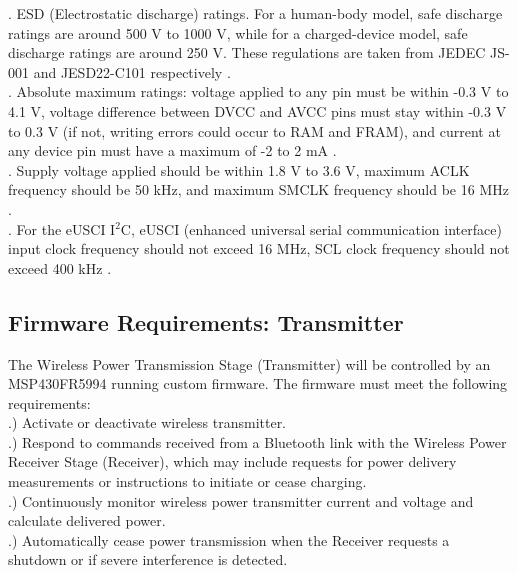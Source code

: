 \documentclass[12pt]{article}
\begin{document}
. ESD (Electrostatic discharge) ratings. For a human-body model, safe discharge ratings are around 500 V to 1000 V, while for a charged-device model, safe discharge ratings are around 250 V. These regulations are taken from JEDEC JS-001 and JESD22-C101 respectively \cite{MSP430FR599x}.\\

. Absolute maximum ratings: voltage applied to any pin must be within -0.3 V to 4.1 V, voltage difference between DVCC and AVCC pins must stay within -0.3 V to 0.3 V (if not, writing errors could occur to RAM and FRAM), and current at any device pin must have a maximum of  -2 to 2 mA \cite{MSP430FR599x}.\\

. Supply voltage applied should be within 1.8 V to 3.6 V, maximum ACLK frequency should be 50 kHz, and maximum SMCLK frequency should be 16 MHz \cite{MSP430FR599x}.\\

. For the eUSCI I$^2$C, eUSCI (enhanced universal serial communication interface) input clock frequency should not exceed 16 MHz, SCL clock frequency should not exceed 400 kHz \cite{MSP430FR599x}.


\subsection{Firmware Requirements: Transmitter}

\indent \indent
The Wireless Power Transmission Stage (Transmitter) will be controlled by an MSP430FR5994 running custom firmware. The firmware must meet the following requirements:\\

.) Activate or deactivate wireless transmitter.\\

.) Respond to commands received from a Bluetooth link with the Wireless Power Receiver Stage (Receiver), which may include requests for power delivery measurements or instructions to initiate or cease charging.\\

.) Continuously monitor wireless power transmitter current and voltage and calculate delivered power.\\

.) Automatically cease power transmission when the Receiver requests a shutdown or if severe interference is detected.\\
\end{document}
